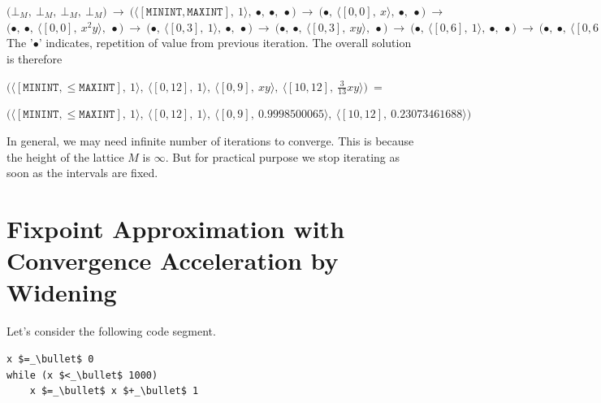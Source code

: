 \documentclass[final,3p, review, times]{Elsevier/elsarticle}
\begin{document}
\noindent
$
\bigg(\bot_M,\ \bot_M,\ \bot_M,\ \bot_M\bigg)\ \to\ 
\bigg(\big\langle[\mathtt{MININT},\mathtt{MAXINT}],\ 1\big\rangle,\ \bullet,\ \bullet,\ \bullet\bigg)\ \to\ 
\bigg(\bullet,\ \big\langle[0,0],\ x\big\rangle,\ \bullet,\ \bullet\bigg)\ \to$\\
$ 
\bigg(\bullet,\ \bullet,\ \big\langle[0,0],\ x^2y\big\rangle,\ \bullet\bigg)\ \to\ \bigg(\bullet,\ \big\langle[0,3],\ 1\big\rangle,\ \bullet,\ \bullet\bigg)\ \to\ \bigg(\bullet,\ \bullet,\ \big\langle[0,3],\ xy\big\rangle,\ \bullet\bigg)\ \to\ \bigg(\bullet,\ \big\langle[0,6],\ 1\big\rangle,\ \bullet,\ \bullet\bigg)\ \to\ \bigg(\bullet,\ \bullet,\ \big\langle[0,6],\ xy\big\rangle,\ \bullet\bigg)\ \to\ \bigg(\bullet,\ \big\langle[0,9],\ 1\big\rangle,\ \bullet,\ \bullet\bigg)\ \to\ \bigg(\bullet,\ \bullet,\ \big\langle[0,9],\ xy\big\rangle,\ \bullet\bigg)\ \to\ \bigg(\bullet,\ \big\langle[0,12],\ 1\big\rangle,\ \bullet,\ \bullet\bigg)\ \to\ \bigg(\bullet,\ \bullet,\ \bullet,\ \big\langle[10,12],\ \frac{3}{13}xy\big\rangle\bigg)
$\\

The '$\bullet$' indicates, repetition of value from previous iteration. The overall solution is therefore

\noindent$\bigg(\Big\langle[\mathtt{MININT},\leq\mathtt{MAXINT}],\ 1\Big\rangle,\ \Big\langle[0,12],\ 1\Big\rangle,\ \Big\langle[0,9],\ xy\Big\rangle,\ \Big\langle[10,12],\ \frac{3}{13}xy\Big\rangle\bigg)\ =$

\noindent$\bigg(\Big\langle[\mathtt{MININT},\leq\mathtt{MAXINT}],\ 1\Big\rangle,\ \Big\langle[0,12],\ 1\Big\rangle,\ \Big\langle[0,9],\ 0.9998500065\Big\rangle,\ \Big\langle[10,12],\ 0.23073461688\Big\rangle\bigg)$

In general, we may need infinite number of iterations to converge. This is because the height of the lattice $M$ is $\infty$. But for practical purpose we stop iterating as soon as the intervals are fixed.


\section{Fixpoint Approximation with Convergence Acceleration by Widening}
 
\noindent Let's consider the following code segment.

\begin{lstlisting}[mathescape]
x $=_\bullet$ 0
while (x $<_\bullet$ 1000)
    x $=_\bullet$ x $+_\bullet$ 1
\end{lstlisting}
\end{document}
